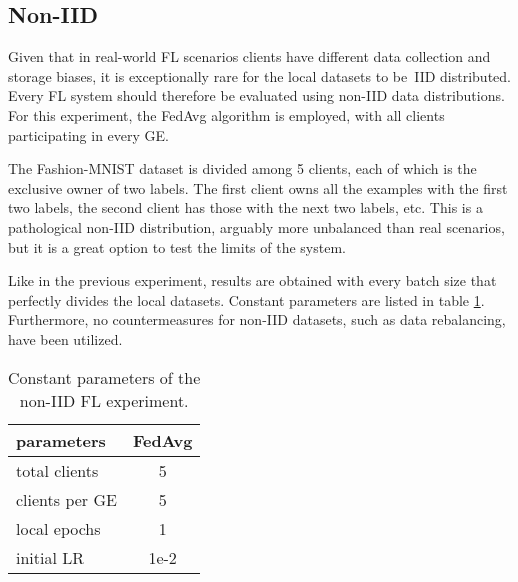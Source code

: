 \subsection{Non-IID}
Given that in real-world FL scenarios clients have different data collection and storage biases, it is exceptionally rare for the local datasets to be IID distributed. Every FL system should therefore be evaluated using non-IID data distributions. For this experiment, the FedAvg algorithm is employed, with all clients participating in every GE. %

The Fashion-MNIST dataset is divided among 5 clients, each of which is the exclusive owner of two labels. The first client owns all the examples with the first two labels, the second client has those with the next two labels, etc. This is a pathological non-IID distribution, arguably more unbalanced than real scenarios, but it is a great option to test the limits of the system. %

Like in the previous experiment, results are obtained with every batch size that perfectly divides the local datasets. Constant parameters are listed in table \ref{table: Non-IID experiment parameters}. Furthermore, no countermeasures for non-IID datasets, such as data rebalancing, have been utilized. %
\begin{table}[H]
    \center
    \begin{tabular}
        { | l | c | }
        \hline
        parameters & FedAvg\\\hline
        total clients   & 5\\\hline
        clients per GE  & 5\\\hline
        local epochs    & 1\\\hline
        initial LR      & 1e-2\\\hline
    \end{tabular}
    \caption[Non-IID experiment parameters]{Constant parameters of the non-IID FL experiment.}
    \label{table: Non-IID experiment parameters}
\end{table}


